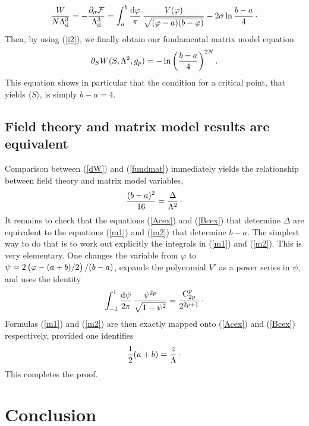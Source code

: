 \documentclass[a4paper,12pt]{article}
\def\d{{\rm d}}
\def\C{{\rm C}}\def\F{{\cal F}}
\begin{document}
%
\begin{equation}
\label{e1}
{W\over N\Ld^{3}}=
-{\partial_{\sigma}{\cal F}\over\Ld^{3}} = \int_{a}^{b}
{\d\varphi\over\pi}\,{ V(\varphi)\over\sqrt{(\varphi -a)(b-\varphi)}}
- 2\sigma\ln {b-a\over 4}\,\cdotp
\end{equation}
%
Then, by using (\ref{i2}), we finally obtain our fundamental matrix 
model equation
%
\begin{equation}
\label{fundmat}
\partial_{S} W (S,\Lambda^{2},g_{p}) = -\ln\left( {b-a\over 4}\right)^{2N} .
\end{equation}
%
This equation shows in particular that the condition for a critical point, 
that yields $\langle S\rangle$, is simply $b-a = 4$. 

%
\subsection{Field theory and matrix model results are equivalent}
%

Comparison between (\ref{dW}) and (\ref{fundmat}) immediately yields the 
relationship between field theory and matrix model variables,
%
\begin{equation}
\label{r1}
{(b-a)^{2}\over 16} = {\Delta\over\Lambda^{2}}\,\cdotp
\end{equation}
%
It remains to check that the equations (\ref{Acex}) and (\ref{Bcex}) that 
determine $\Delta$ are equivalent to the equations (\ref{m1}) and
(\ref{m2}) that determine $b-a$. The simplest way to do that is to work 
out explicitly the integrals in (\ref{m1}) and (\ref{m2}). This is very 
elementary. One changes the variable from $\varphi$ to $\psi =
2\left(\strut\varphi - (a+b)/2\right)/(b-a)$, expands the polynomial
$V'$ as a power series in $\psi$, and uses the identity
%
\begin{equation}
\label{intf}
\int_{-1}^{1}{\d\psi\over 2\pi}\, {\psi^{2p}\over\sqrt{1-\psi^{2}}} = 
{\C_{2p}^{p}\over 2^{2p+1}}\,\cdotp
\end{equation}
%
Formulas (\ref{m1}) and (\ref{m2}) are then exactly mapped onto 
(\ref{Acex}) and (\ref{Bcex}) respectively, provided one identifies
%
\begin{equation}
\label{r2}
{1\over 2} (a+b) = {z\over\Lambda}\,\cdotp
\end{equation}
%
This completes the proof.

%
\section{Conclusion}
%
\end{document}
